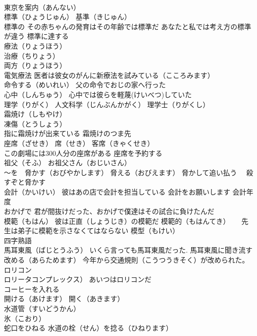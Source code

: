 \documentclass[8pt]{extreport}
\begin{document}
\begin{CJK}{UTF8}{min}
\\	東京を案内（あんない）
\\	標準（ひょうじゅん） 基準（きじゅん）
\\	標準の その赤ちゃんの発育はその年齢では標準だ あなたと私では考え方の標準が違う 標準に達する
\\	療法（りょうほう）
\\	治療（ちりょう）
\\	両方（りょうほう）
\\	電気療法 医者は彼女のがんに新療法を試みている（こころみます）
\\	命令する（めいれい） 父の命令でおじの家へ行った
\\	心中（しんちゅう） 心中では彼らを軽蔑(けいべつ)していた
\\	理学（りがく） 人文科学（じんぶんかがく） 理学士（りがくし）
\\	霜焼け（しもやけ）
\\	凍傷（とうしょう）
\\	指に霜焼けが出来ている 霜焼けのつま先
\\	座席（ざせき） 席（せき） 客席（きゃくせき）
\\	この劇場には300人分の座席がある 座席を予約する
\\	祖父（そふ） お祖父さん（おじいさん）
\\	～を　脅かす（おびやかします） 脅える（おびえます） 脅かして追い払う　 殺すぞと脅かす
\\	会計（かいけい） 彼はあの店で会計を担当している 会計をお願いします 会計年度
\\	おかげで 君が間抜けだった、おかげで僕達はその試合に負けたんだ
\\	模範（もはん） 彼は正直（しょうじき）の模範だ 模範的（もはんてき） 　 先生は弟子に模範を示さなくてはならない 模型（もけい）
\\	四字熟語 
\\	馬耳東風（ばじとうふう） いくら言っても馬耳東風だった. 馬耳東風に聞き流す
\\	改める（あらためます） 今年から交通規則（こうつうきそく）が改められた。
\\	ロリコン 
\\	ロリータコンプレックス） あいつはロリコンだ
\\	コーヒーを入れる
\\	開ける（あけます） 開く（あきます）
\\	水道管（すいどうかん）
\\	氷（こおり）
\\	蛇口をひねる 水道の栓（せん）を捻る（ひねります）

\end{CJK}
\end{document}
